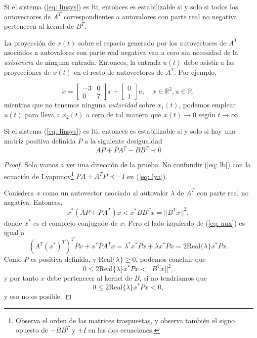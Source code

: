 \begin{theorem}
	Si el sistema (\ref{eq: linsys}) es lti, entonces es estabilizable si y solo si todos los autovectores de $A^T$ correspondientes a autovalores con parte real no negativa pertenecen al kernel de $B^T$.
\end{theorem}

La proyección de $x(t)$ sobre el espacio generado por los autovectores de $A^T$ asociados a autovalores con parte real negativa van a cero sin necesidad de la \emph{asistencia} de ninguna entrada. Entonces, la entrada $u(t)$ debe asistir a las proyecciones de $x(t)$ en el resto de autovectores de $A^T$. Por ejemplo,

\begin{equation}
	\dot x = \begin{bmatrix}-3 & 0 \\ 0 & 7\end{bmatrix}x + \begin{bmatrix}0 \\ 1\end{bmatrix}u, \quad x\in\mathbb{R}^2, u\in\mathbb{R},
\end{equation}
mientras que no tenemos ninguna \emph{autoridad} sobre $x_1(t)$, podemos emplear $u(t)$ para lleva a $x_2(t)$ a cero de tal manera que $x(t)\to 0$ según $t\to\infty$.
\begin{theorem}
	Si el sistema (\ref{eq: linsys}) es lti, entonces es estabilizable si y solo si hay una matriz positiva definida $P$ a la siguiente desigualdad
	\begin{equation}
	AP + PA^T - BB^T \prec 0
		\label{eq: lb}
	\end{equation}
\end{theorem}
\begin{proof}
	Solo vamos a ver una dirección de la prueba. No confundir (\ref{eq: lb}) con la ecuación de Lyapunov\footnote{Observa el orden de las matrices traspuestas, y observa también el signo opuesto de $-BB^T$ y $+I$ en las dos ecuaciones.} $PA+A^TP \prec -I$ en (\ref{eq: lya}).

Conisdera $x$ como un autovector asociado al autovalor $\lambda$ de $A^T$ con parte real no negativa. Entonces,
	\begin{equation}
	x^*(AP+PA^T)x < x^*BB^Tx = ||B^Tx||^2,
		\label{eq: aux}
	\end{equation}
	donde $x^*$ es el complejo conjugado de $x$. Pero el lado izquierdo de (\ref{eq: aux}) es igual a 
	\begin{equation}
		(A^T(x^*)^T)^TPx + x^*PA^Tx = \lambda^*x^*Px + \lambda x^*Px = 2\text{Real}\{\lambda\}x^*Px.
	\end{equation}
	Como $P$ es positiva definida, y $\text{Real}\{\lambda\} \geq 0$, podemos concluir que 
\begin{equation}
0 \leq 2\text{Real}\{\lambda\}x^*Px < ||B^Tx||^2,
\end{equation}
y por tanto $x$ debe pertenecer al kernel de $B$, si no tendríamos que 
\begin{equation}
0 \leq 2\text{Real}\{\lambda\}x^*Px < 0,
\end{equation}
y eso no es posible.
\end{proof}

